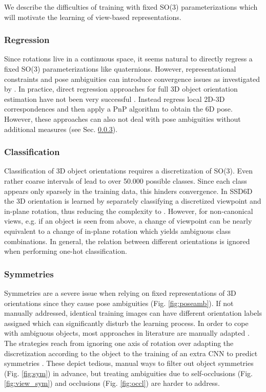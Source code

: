 We describe the difficulties of training with fixed SO(3) parameterizations which will motivate the learning of view-based representations. 

\subsubsection{Regression} 

Since rotations live in a continuous space, it seems natural to directly regress a fixed SO(3) parameterizations like quaternions. However, representational constraints and pose ambiguities can introduce convergence issues as investigated by \cite{saxena2009learning}. In practice, direct regression approaches for full 3D object orientation estimation have not been very successful \citep{mahendran20173d}. Instead \cite{tremblay2018deep,tekin2017real,rad2017bb8} regress local 2D-3D correspondences and then apply a \gls{PnP} algorithm to obtain the 6D pose. However, these approaches can also not deal with pose ambiguities without additional measures (see Sec. \ref{sec:sym}).

\subsubsection{Classification} 

Classification of 3D object orientations requires a discretization of SO(3). Even rather coarse intervals of  lead to over 50.000 possible classes. Since each class appears only sparsely in the training data, this hinders convergence. In SSD6D \citep{kehl2017ssd} the 3D orientation is learned by separately classifying a discretized viewpoint and in-plane rotation, thus reducing the complexity to . However, for non-canonical views, e.g. if an object is seen from above, a change of viewpoint can be nearly equivalent to a change of in-plane rotation which yields ambiguous class combinations. In general, the relation between different orientations is ignored when performing one-hot classification.

\subsubsection{Symmetries} 
\label{sec:sym}
Symmetries are a severe issue when relying on fixed representations of 3D orientations since they cause pose ambiguities (Fig. \ref{fig:poseamb}). If not manually addressed, identical training images can have different orientation labels assigned which can significantly disturb the learning process. In order to cope with ambiguous objects, most approaches in literature are manually adapted \citep{wohlhart2015learning,hinterstoisser2012gradient,kehl2017ssd,rad2017bb8}. The strategies reach from ignoring one axis of rotation \citep{wohlhart2015learning,hinterstoisser2012gradient} over adapting the discretization according to the object \citep{kehl2017ssd} to the training of an extra \gls{CNN} to predict symmetries \citep{rad2017bb8}. These depict tedious, manual ways to filter out object symmetries (Fig. \ref{fig:sym}) in advance, but treating ambiguities due to self-occlusions (Fig. \ref{fig:view_sym}) and occlusions (Fig. \ref{fig:occl}) are harder to address. 

